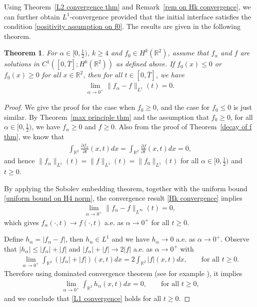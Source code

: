 \documentclass[reqno]{amsart}%
\newtheorem{thm}{Theorem}[section]
\theoremstyle{definition}
\theoremstyle{remark}
\numberwithin{equation}{section}
\newcommand{\0}{\mathbf{0}}
\newcommand{\1}{\mathbf{1}}
\newcommand{\R}{\mathbb R}
\numberwithin{equation}{section}
\numberwithin{theorem}{section}
\numberwithin{figure}{section}
\begin{document}
Using Theorem~\ref{L2 convergence thm} and Remark~\ref{rem on Hk convergence}, we can further obtain $L^1$-convergence provided that the initial interface satisfies the condition \eqref{positivity assumption on f0}. The results are given in the following theorem.
\begin{thm}\label{L1 convergence thm}
For $\alpha\in[0,\frac{1}{2})$, $k\ge4$ and $f_0\in H^k(\R^2)$, assume that $f_\alpha$ and $f$ are solutions in $C^1([0,\bar{T}];H^k(\R^2))$ as defined above. If $f_0(x)\le0$ or $f_0(x)\ge0$ for all $x\in\R^2$, then for all $t\in[0,\bar{T}]$, we have
\begin{align}\label{L1 convergence}
\lim_{\alpha\to0^+}\|f_\alpha - f\|_{L^1}(t)=0.
\end{align}
\end{thm}
\begin{proof}
We give the proof for the case when $f_0\ge0$, and the case for $f_0\le0$ is just similar. By Theorem~\ref{max principle thm} and the assumption that $f_0\ge0$, for all $\alpha\in[0,\frac{1}{2})$, we have $f_{\alpha}\ge0$ and $f\ge0$. Also from the proof of Theorem~\ref{decay of f thm}, we know that
\begin{align*}
\int_{\R^2}\frac{\partial f_\alpha}{\partial t}(x,t)dx = \int_{\R^2}\frac{\partial f}{\partial t}(x,t)dx = 0,
\end{align*}
and hence $\|f_\alpha\|_{L^1}(t)=\|f\|_{L^1}(t)=\|f_0\|_{L^1}(t) $ for all $\alpha\in[0,\frac{1}{2})$ and $t\ge0$.

By applying the Sobolev embedding theorem, together with the uniform bound \eqref{uniform bound on H4 norm}, the convergence result \eqref{Hk convergence} implies
\begin{align*}
\lim_{\alpha\to0^+}\|f_\alpha - f\|_{L^\infty}(t)=0,
\end{align*}
which gives $f_\alpha(\cdot,t)\to f(\cdot,t)$ a.e. as $\alpha\to0^+$ for all $t\ge0$. 

Define $h_{\alpha}=|f_\alpha - f|$, then $h_{\alpha}\in L^1$ and we have $h_{\alpha}\to0$ a.e. as $\alpha\to0^+$. Observe that $|h_{\alpha}|\le|f_\alpha| + |f|$ and $|f_\alpha| + |f|\to 2|f|$ a.e. as $\alpha\to0^+$ with 
\begin{align*}
\lim_{\alpha\to0^+}\int_{\R^2}(|f_\alpha| + |f|)(x,t)dx=2\int_{\R^2}|f|(x,t)dx,\qquad\text{for all $t\ge0$.}
\end{align*}
Therefore using dominated convergence theorem (see for example \cite{Fo99}), it implies
\begin{align*}
\lim_{\alpha\to0^+}\int_{\R^2}h_{\alpha}(x,t)dx=0,\qquad\text{for all $t\ge0$,}
\end{align*}
and we conclude that \eqref{L1 convergence} holds for all $t\ge0$.
\end{proof}
\end{document}
